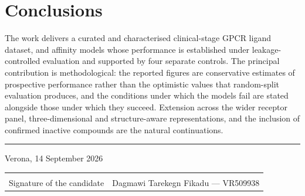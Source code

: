\documentclass[11pt,a4paper]{article}
\begin{document}
\section{Conclusions}
The work delivers a curated and characterised clinical-stage GPCR ligand dataset, and
affinity models whose performance is established under leakage-controlled evaluation and
supported by four separate controls. The principal contribution is methodological: the
reported figures are conservative estimates of prospective performance rather than the
optimistic values that random-split evaluation produces, and the conditions under which the
models fail are stated alongside those under which they succeed. Extension across the wider
receptor panel, three-dimensional and structure-aware representations, and the inclusion of
confirmed inactive compounds are the natural continuations.

\vspace{10pt}
\hrule
\vspace{8pt}

\noindent Verona, 14 September 2026

\vspace{22pt}
\noindent
\begin{tabularx}{\textwidth}{@{}p{}X@{}}
  \hrulefill & \\[2pt]
  {\footnotesize Signature of the candidate} &
  {\footnotesize Dagmawi Tarekegn Fikadu --- VR509938} \\
\end{tabularx}
\end{document}
